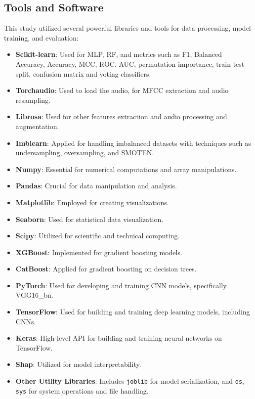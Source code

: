 \subsection{Tools and Software}

This study utilized several powerful libraries and tools for data processing, model training, and evaluation:

\begin{itemize}[leftmargin=*]
    \item \textbf{Scikit-learn}: Used for MLP, RF, and metrics such as F1, Balanced Accuracy, Accuracy, MCC, ROC, AUC, permutation importance, train-test split, confusion matrix and voting classifiers.
    \item \textbf{Torchaudio}: Used to load the audio, for MFCC extraction and audio resampling.
    \item \textbf{Librosa}: Used for other features extraction and audio processing and augmentation.
    \item \textbf{Imblearn}: Applied for handling imbalanced datasets with techniques such as undersampling, oversampling, and SMOTEN.
    \item \textbf{Numpy}: Essential for numerical computations and array manipulations.
    \item \textbf{Pandas}: Crucial for data manipulation and analysis.
    \item \textbf{Matplotlib}: Employed for creating visualizations.
    \item \textbf{Seaborn}: Used for statistical data visualization.
    \item \textbf{Scipy}: Utilized for scientific and technical computing.
    \item \textbf{XGBoost}: Implemented for gradient boosting models.
    \item \textbf{CatBoost}: Applied for gradient boosting on decision trees.
    \item \textbf{PyTorch}: Used for developing and training CNN models, specifically VGG16\_bn.
    \item \textbf{TensorFlow}: Used for building and training deep learning models, including CNNs.
    \item \textbf{Keras}: High-level API for building and training neural networks on TensorFlow.
    \item \textbf{Shap}: Utilized for model interpretability.
    \item \textbf{Other Utility Libraries}: Includes \texttt{joblib} for model serialization, and \texttt{os}, \texttt{sys} for system operations and file handling.
\end{itemize}
